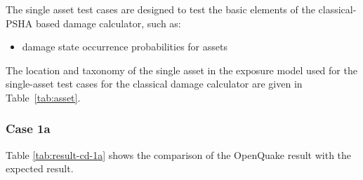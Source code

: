 The single asset test cases are designed to test the basic elements of the classical-PSHA based damage calculator, such as:

\begin{itemize}
\item damage state occurrence probabilities for assets
\end{itemize}

The location and taxonomy of the single asset in the exposure model used for the single-asset test cases for the classical damage calculator are given in Table~\ref{tab:asset}.


\subsubsection{Case 1a}



Table \ref{tab:result-cd-1a} shows the comparison of the OpenQuake result with the expected result.


